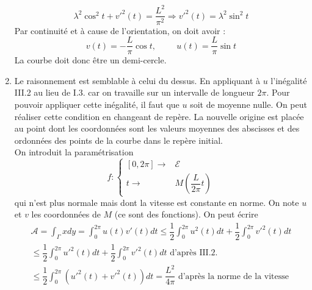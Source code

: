 \begin{enumerate}
\begin{displaymath}
 \lambda^2 \cos^2t + v'^2(t)=\frac{L^2}{\pi^2} \Rightarrow v'^2(t)=\lambda^2\sin^2t
\end{displaymath}
Par continuité et à cause de l'orientation, on doit avoir :
\begin{displaymath}
 v(t)=-\frac{L}{\pi}\cos t, \hspace{1cm} u(t)= \frac{L}{\pi}\sin t
\end{displaymath}
La courbe doit donc être un demi-cercle.
 \item Le raisonnement est semblable à celui du dessus. En appliquant à $u$ l'inégalité III.2 au lieu de I.3. car on travaille sur un intervalle de longueur $2\pi$. Pour pouvoir appliquer cette inégalité, il faut que $u$ soit de moyenne nulle. On peut réaliser cette condition en changeant de repère. La nouvelle origine est placée au point dont les coordonnées sont les valeurs moyennes des abscisses et des ordonnées des points de la courbe dans le repère initial.\\ On introduit la paramétrisation 
\begin{displaymath}
f :\left\lbrace 
\begin{aligned}
 \left[ 0 , 2\pi \right]  \rightarrow & \mathcal E\\
 t \rightarrow & M(\dfrac{L}{2\pi}t)
\end{aligned}
\right. 
\end{displaymath}
qui n'est plus normale mais dont la vitesse est constante en norme. On note $u$ et $v$ les coordonnées de $M$ (ce sont des fonctions). On peut écrire
\begin{multline*}
 \mathcal A = \int_{\Gamma}xdy
= \int_{0}^{2\pi}u(t)v'(t)dt
\leq \dfrac{1}{2}\int_{0}^{2\pi}u^2(t)dt + \dfrac{1}{2}\int_{0}^{2\pi}v'^2(t)dt\\
\leq \dfrac{1}{2}\int_{0}^{2\pi}u'^2(t)dt + \dfrac{1}{2}\int_{0}^{2\pi}v'^2(t)dt
\text{ d'après III.2.}\\
\leq \dfrac{1}{2}\int_{0}^{2\pi}\left( u'^2(t)+v'^2(t)\right) dt
=\dfrac{L^2}{4\pi} \text{ d'après la norme de la vitesse}
\end{multline*}
\end{enumerate}
